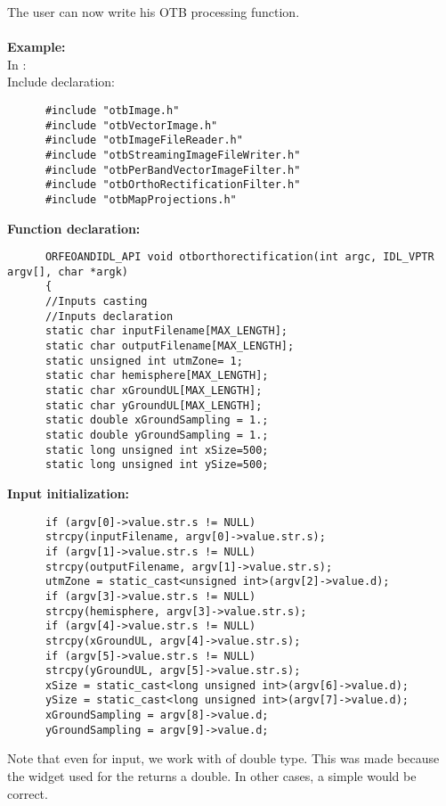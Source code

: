 The user can now write his OTB processing function.
\\
\\
\textbf{Example:}\\
      In :\\
      Include declaration:\\
\begin{verbatim}
      #include "otbImage.h"
      #include "otbVectorImage.h"
      #include "otbImageFileReader.h"
      #include "otbStreamingImageFileWriter.h"
      #include "otbPerBandVectorImageFilter.h"
      #include "otbOrthoRectificationFilter.h"
      #include "otbMapProjections.h"
\end{verbatim}

      \textbf{Function declaration:}\\
\begin{verbatim}
      ORFEOANDIDL_API void otborthorectification(int argc, IDL_VPTR argv[], char *argk)
      {
      //Inputs casting
      //Inputs declaration
      static char inputFilename[MAX_LENGTH];
      static char outputFilename[MAX_LENGTH];
      static unsigned int utmZone= 1;
      static char hemisphere[MAX_LENGTH];
      static char xGroundUL[MAX_LENGTH];
      static char yGroundUL[MAX_LENGTH];
      static double xGroundSampling = 1.;
      static double yGroundSampling = 1.;
      static long unsigned int xSize=500;
      static long unsigned int ySize=500;
\end{verbatim}

      \textbf{Input initialization:}\\
\begin{verbatim}
      if (argv[0]->value.str.s != NULL)
      strcpy(inputFilename, argv[0]->value.str.s);
      if (argv[1]->value.str.s != NULL)
      strcpy(outputFilename, argv[1]->value.str.s);
      utmZone = static_cast<unsigned int>(argv[2]->value.d);
      if (argv[3]->value.str.s != NULL)
      strcpy(hemisphere, argv[3]->value.str.s);
      if (argv[4]->value.str.s != NULL)
      strcpy(xGroundUL, argv[4]->value.str.s);
      if (argv[5]->value.str.s != NULL)
      strcpy(yGroundUL, argv[5]->value.str.s);
      xSize = static_cast<long unsigned int>(argv[6]->value.d);
      ySize = static_cast<long unsigned int>(argv[7]->value.d);
      xGroundSampling = argv[8]->value.d;
      yGroundSampling = argv[9]->value.d;
\end{verbatim}
Note that even for  input, we work with  of double type. This was made because the widget used for the  returns a double. In other cases, a simple  would be correct.\\

